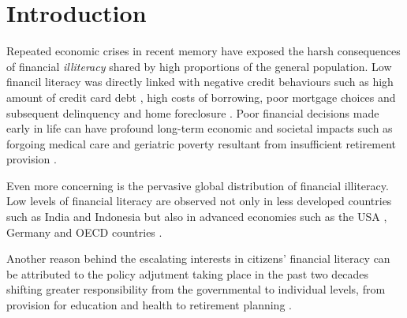 \documentclass[a4paper,11pt,UKenglish,twoside,openright]{report}\usepackage[]{graphicx}\usepackage[]{color}
\begin{document}
\clearpage
\thispagestyle{empty}

\setcounter{page}{0} %


\chapter{Introduction}
\label{chp:1}



Repeated economic crises in recent memory have exposed the harsh consequences of financial \emph{illiteracy} shared by high proportions of the general population. Low financil literacy was directly linked with negative credit behaviours such as high amount of credit card debt \parencite{meier:2010}, high costs of borrowing, poor mortgage choices and subsequent delinquency and home foreclosure \parencite{hastings:2013}. Poor financial decisions made early in life can have profound long-term economic and societal impacts \parencite{montoya:2013} such as forgoing medical care \parencite{lusardi:2015} and geriatric poverty resultant from insufficient retirement provision \parencite{lusardi:2007, lusardi:2008}.

Even more concerning is the pervasive global distribution of financial illiteracy. Low levels of financial literacy are observed not only in less developed countries such as India and Indonesia \parencite{cole:2009} but also in advanced economies such as the USA \parencite{gale:2012, huston:2012, lusardi:2010}, Germany \parencite{bucherkoenen:2017} and OECD countries \parencite{lusardi:2015a}.

Another reason behind the escalating interests in citizens' financial literacy can be attributed to the policy adjutment taking place in the past two decades shifting greater responsibility from the governmental to individual levels, from provision for education and health to retirement planning \parencite{hastings:2013}.
\end{document}
